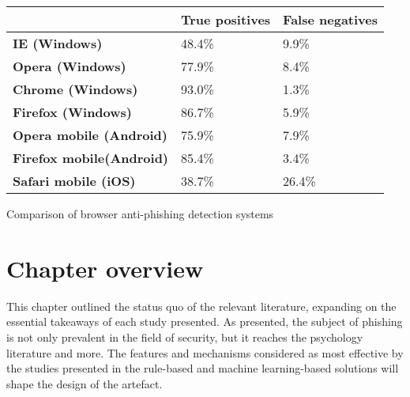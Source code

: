 \begin{center}
	\footnotesize
	\label{tab:OPTIMISED_MODELS}
	\begin{tabularx}{\textwidth}{ | X | X | X | }
		\hline
		                                 & \textbf{True positives} & \textbf{False negatives} \\
		\hline
		\textbf{IE (Windows)}            & 48.4\%                  & 9.9\%                    \\
		\hline
		\textbf{Opera (Windows)}         & 77.9\%                  & 8.4\%                    \\
		\hline
		\textbf{Chrome (Windows)}        & 93.0\%                  & 1.3\%                    \\
		\hline
		\textbf{Firefox (Windows)}       & 86.7\%                  & 5.9\%                    \\
		\hline
		\textbf{Opera mobile (Android)}  & 75.9\%                  & 7.9\%                    \\
		\hline
		\textbf{Firefox mobile(Android)} & 85.4\%                  & 3.4\%                    \\
		\hline
		\textbf{Safari mobile (iOS)}     & 38.7\%                  & 26.4\%                   \\
		\hline
	\end{tabularx}
	\captionsetup{type=table}\caption{Comparison of browser anti-phishing detection systems \citep{Adebowale}}
\end{center}


\section{Chapter overview}
This chapter outlined the status quo of the relevant literature, expanding on the essential takeaways of each study presented. As presented, the subject of phishing is not only prevalent in the field of security, but it reaches the psychology literature and more. The features and mechanisms considered as most effective by the studies presented in the rule-based and machine learning-based solutions will shape the design of the artefact.

